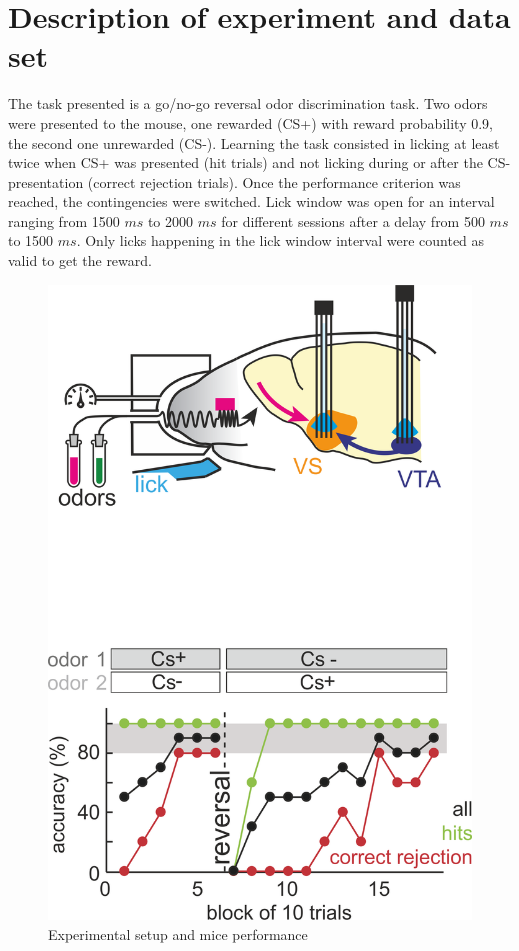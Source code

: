 \section{Description of experiment and data set}
The task presented is a go/no-go reversal odor discrimination task. Two odors were presented to the mouse, one rewarded (CS+) with reward probability 0.9, the second one unrewarded (CS-). Learning the task consisted in licking at least twice when CS+ was presented (hit trials) and not licking during or after the CS- presentation (correct rejection trials). Once the performance criterion was reached, the contingencies were switched. Lick window was open for an interval ranging from 1500 $ms$ to 2000 $ms$ for different sessions after a delay from 500 $ms$ to 1500 $ms$. Only licks happening in the lick window interval were counted as valid to get the reward.
\begin{figure}
    \centering
    \includegraphics[scale=0.3]{figures/experiment.png}
    \caption{Experimental setup and mice performance}
    \label{fig:experiment}
\end{figure}
